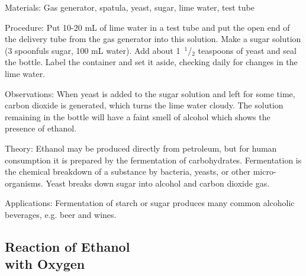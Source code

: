 \begin{multicols}{2}
\begin{description*}
\item[Materials:]{Gas generator, spatula, yeast, sugar, lime water, test tube}
\item[Procedure:]{Put 10-20 mL of lime water in a test tube and put the open end of the delivery tube from the gas generator into this solution. Make a sugar solution (3 spoonfuls sugar, 100 mL water). Add about 1~$^1$/$_2$ teaspoons of yeast and seal the bottle. Label the container and set it aside, checking daily for changes in the lime water.}
\item[Observations:]{When yeast is added to the sugar solution and left for some time, carbon dioxide is generated, which turns the lime water cloudy. The solution remaining in the bottle will have a faint smell of alcohol which shows the presence of ethanol.}
\item[Theory:]{Ethanol may be produced directly from petroleum, but for human consumption it is prepared by the fermentation of carbohydrates. Fermentation is the chemical breakdown of a substance by bacteria, yeasts, or other micro-organisms. Yeast breaks down sugar into alcohol and carbon dioxide gas.}
\item[Applications:]{Fermentation of starch or sugar produces many common alcoholic beverages, e.g. beer and wines.}
\end{description*}

\vfill
\columnbreak

\subsection[Reaction of Ethanol with Oxygen]{Reaction of Ethanol \hfill \\ with Oxygen}



\end{multicols}
